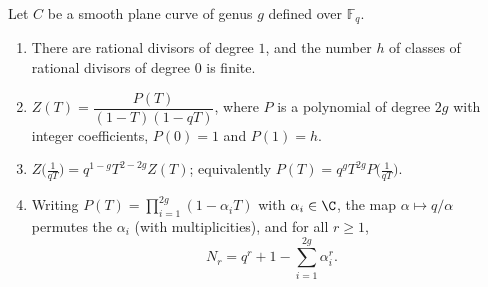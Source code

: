 \begin{theorem}\label{thm:rationality}
Let $C$ be a smooth plane curve of genus $g$ defined over $\mathbb F_q$.
\begin{enumerate}[label=(\alph*)]
\item There are rational divisors of degree $1$, and the number $h$ of classes of rational divisors of degree $0$ is finite.
\item $Z(T)=\dfrac{P(T)}{(1-T)(1-qT)}$, where $P$ is a polynomial of degree $2g$ with integer coefficients, $P(0)=1$ and $P(1)=h$.
\item $Z\bigl(\frac1{qT}\bigr)=q^{1-g}T^{2-2g}Z(T)$; equivalently $P(T)=q^gT^{2g}P\bigl(\frac1{qT}\bigr)$.
\item Writing $P(T)=\prod_{i=1}^{2g}(1-\alpha_iT)$ with $\alpha_i\in\C$, the map $\alpha\mapsto q/\alpha$ permutes the $\alpha_i$ (with multiplicities), and
for all $r\ge1$,
\[
N_r=q^r+1-\sum_{i=1}^{2g}\alpha_i^r.
\]
\end{enumerate}
\end{theorem}
